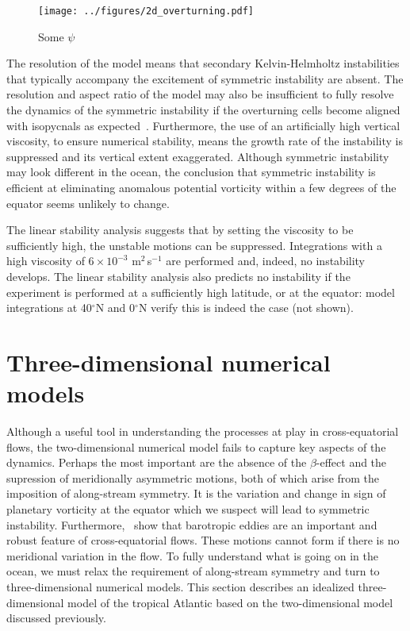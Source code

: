 \begin{figure}
    \centering
    \texttt{[image: ../figures/2d\_overturning.pdf]}
    \caption{Some $\psi$}
    \label{fig:2DStandardOverturningStreamfunction}
\end{figure}

The resolution of the model means that secondary Kelvin-Helmholtz instabilities that typically accompany the excitement of symmetric instability are absent. The resolution and aspect ratio of the model may also be insufficient to fully resolve the dynamics of the symmetric instability if the overturning cells become aligned with isopycnals as expected~\citep{Bachman2014}. Furthermore, the use of an artificially high vertical viscosity, to ensure numerical stability,  means the growth rate of the instability is suppressed and its vertical extent exaggerated. Although symmetric instability may look different in the ocean, the conclusion that symmetric instability is efficient at eliminating anomalous potential vorticity within a few degrees of the equator seems unlikely to change.

The linear stability analysis suggests that by setting the viscosity to be sufficiently high, the unstable motions can be suppressed. Integrations with a high viscosity of $6 \times 10^{-3}$ m$^2$\,s$^{-1}$ are performed and, indeed, no instability develops. The linear stability analysis also predicts no instability if the experiment is performed at a sufficiently high latitude, or at the equator: model integrations at 40$^{\circ}$N and 0$^{\circ}$N verify this is indeed the case (not shown).

\section{Three-dimensional numerical models}
Although a useful tool in understanding the processes at play in cross-equatorial flows, the two-dimensional numerical model fails to capture key aspects of the dynamics. Perhaps the most important are the absence of the $\beta$-effect and the supression of meridionally asymmetric motions, both of which arise from the imposition of along-stream symmetry. It is the variation and change in sign of planetary vorticity at the equator which we suspect will lead to symmetric instability. Furthermore,~\citet{Edwards1998II} show that barotropic eddies are an important and robust feature of cross-equatorial flows. These motions cannot form if there is no meridional variation in the flow. To fully understand what is going on in the ocean, we must relax the requirement of along-stream symmetry and turn to three-dimensional numerical models. This section describes an idealized three-dimensional model of the tropical Atlantic based on the two-dimensional model discussed previously.

